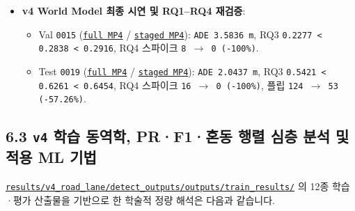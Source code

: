 \documentclass[10.5pt,a4paper]{article}
\begin{document}
\begin{itemize}[leftmargin=1.5em,itemsep=2pt]
\begin{itemize}[leftmargin=1.5em,itemsep=2pt]
\end{itemize}
\item \textbf{v4 World Model 최종 시연 및 RQ1--RQ4 재검증}:
\begin{itemize}[leftmargin=1.5em,itemsep=2pt]
\item Val \texttt{0015} (\href{https://github.com/Heisnotanimposter/Totalcare\_autonomous\_driving\_Yolov5/blob/main/results/v4\_road\_lane/world\_outputs/v4\_world\_outputs/world\_model\_0015\_full/world\_model\_demo\_0015.mp4}{\texttt{full MP4}} / \href{https://github.com/Heisnotanimposter/Totalcare\_autonomous\_driving\_Yolov5/blob/main/results/v4\_road\_lane/world\_outputs/v4\_world\_outputs/world\_model\_0015\_staged/world\_model\_demo\_0015.mp4}{\texttt{staged MP4}}): \texttt{ADE 3.\allowbreak{}5836 m}, RQ3 \texttt{0.\allowbreak{}2277 < 0.\allowbreak{}2838 < 0.\allowbreak{}2916}, RQ4 스파이크 \texttt{8 $\rightarrow$ 0 (-\allowbreak{}100\%)}.
\item Test \texttt{0019} (\href{https://github.com/Heisnotanimposter/Totalcare\_autonomous\_driving\_Yolov5/blob/main/results/v4\_road\_lane/world\_outputs/v4\_world\_outputs/world\_model\_0019\_full/world\_model\_demo\_0019.mp4}{\texttt{full MP4}} / \href{https://github.com/Heisnotanimposter/Totalcare\_autonomous\_driving\_Yolov5/blob/main/results/v4\_road\_lane/world\_outputs/v4\_world\_outputs/world\_model\_0019\_staged/world\_model\_demo\_0019.mp4}{\texttt{staged MP4}}): \texttt{ADE 2.\allowbreak{}0437 m}, RQ3 \texttt{0.\allowbreak{}5421 < 0.\allowbreak{}6261 < 0.\allowbreak{}6454}, RQ4 스파이크 \texttt{16 $\rightarrow$ 0 (-\allowbreak{}100\%)}, 플립 \texttt{124 $\rightarrow$ 53 (-\allowbreak{}57.\allowbreak{}26\%)}.
\end{itemize}
\end{itemize}

\subsection{6.3 \texttt{v4} 학습 동역학, PR·F1·혼동 행렬 심층 분석 및 적용 ML 기법}

\href{https://github.com/Heisnotanimposter/Totalcare\_autonomous\_driving\_Yolov5/tree/main/results/v4\_road\_lane/detect\_outputs/outputs/train\_results}{\texttt{results/\allowbreak{}v4\_\allowbreak{}road\_\allowbreak{}lane/\allowbreak{}detect\_\allowbreak{}outputs/\allowbreak{}outputs/\allowbreak{}train\_\allowbreak{}results/\allowbreak{}}} 의 12종 학습·평가 산출물을 기반으로 한 학술적 정량 해석은 다음과 같습니다.
\end{document}

